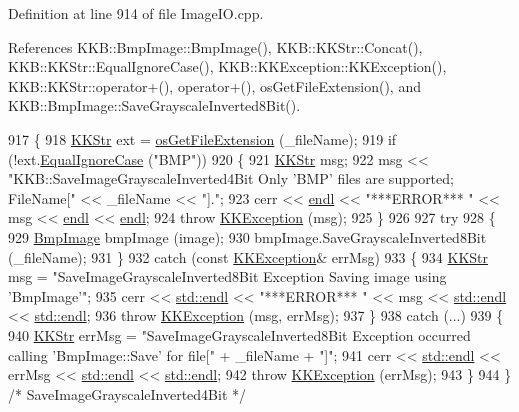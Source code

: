 Definition at line 914 of file Image\+I\+O.\+cpp.



References K\+K\+B\+::\+Bmp\+Image\+::\+Bmp\+Image(), K\+K\+B\+::\+K\+K\+Str\+::\+Concat(), K\+K\+B\+::\+K\+K\+Str\+::\+Equal\+Ignore\+Case(), K\+K\+B\+::\+K\+K\+Exception\+::\+K\+K\+Exception(), K\+K\+B\+::\+K\+K\+Str\+::operator+(), operator+(), os\+Get\+File\+Extension(), and K\+K\+B\+::\+Bmp\+Image\+::\+Save\+Grayscale\+Inverted8\+Bit().


\begin{DoxyCode}
917 \{
918   \hyperlink{class_k_k_b_1_1_k_k_str}{KKStr}  ext = \hyperlink{namespace_k_k_b_ac66b0fee156008ea19ba4a0068378743}{osGetFileExtension} (\_fileName);
919   \textcolor{keywordflow}{if}  (!ext.\hyperlink{class_k_k_b_1_1_k_k_str_a562f9696417c53f66bc4088eac072ab5}{EqualIgnoreCase} (\textcolor{stringliteral}{"BMP"}))
920   \{
921     \hyperlink{class_k_k_b_1_1_k_k_str}{KKStr} msg;
922     msg << \textcolor{stringliteral}{"KKB::SaveImageGrayscaleInverted4Bit   Only 'BMP' files are supported;  FileName["} << \_fileName 
      << \textcolor{stringliteral}{"]."};
923     cerr << \hyperlink{namespace_k_k_b_ad1f50f65af6adc8fa9e6f62d007818a8}{endl} << \textcolor{stringliteral}{"***ERROR***    "} << msg << \hyperlink{namespace_k_k_b_ad1f50f65af6adc8fa9e6f62d007818a8}{endl} << \hyperlink{namespace_k_k_b_ad1f50f65af6adc8fa9e6f62d007818a8}{endl};
924     \textcolor{keywordflow}{throw} \hyperlink{class_k_k_b_1_1_k_k_exception}{KKException} (msg);
925   \}
926 
927   \textcolor{keywordflow}{try}
928   \{
929     \hyperlink{class_k_k_b_1_1_bmp_image}{BmpImage}  bmpImage (image);
930     bmpImage.SaveGrayscaleInverted8Bit (\_fileName);
931   \}
932   \textcolor{keywordflow}{catch}  (\textcolor{keyword}{const} \hyperlink{class_k_k_b_1_1_k_k_exception}{KKException}&  errMsg)
933   \{
934     \hyperlink{class_k_k_b_1_1_k_k_str}{KKStr} msg = \textcolor{stringliteral}{"SaveImageGrayscaleInverted8Bit  Exception  Saving image using 'BmpImage'"};
935     cerr << \hyperlink{namespace_k_k_b_ad1f50f65af6adc8fa9e6f62d007818a8}{std::endl} << \textcolor{stringliteral}{"***ERROR***    "} << msg << \hyperlink{namespace_k_k_b_ad1f50f65af6adc8fa9e6f62d007818a8}{std::endl} << 
      \hyperlink{namespace_k_k_b_ad1f50f65af6adc8fa9e6f62d007818a8}{std::endl};
936     \textcolor{keywordflow}{throw} \hyperlink{class_k_k_b_1_1_k_k_exception}{KKException} (msg, errMsg);
937   \}
938   \textcolor{keywordflow}{catch} (...)
939   \{
940     \hyperlink{class_k_k_b_1_1_k_k_str}{KKStr}  errMsg = \textcolor{stringliteral}{"SaveImageGrayscaleInverted8Bit   Exception occurred calling 'BmpImage::Save'  for
       file["} + \_fileName + \textcolor{stringliteral}{"]"};
941     cerr << \hyperlink{namespace_k_k_b_ad1f50f65af6adc8fa9e6f62d007818a8}{std::endl} << errMsg << \hyperlink{namespace_k_k_b_ad1f50f65af6adc8fa9e6f62d007818a8}{std::endl} << \hyperlink{namespace_k_k_b_ad1f50f65af6adc8fa9e6f62d007818a8}{std::endl};
942     \textcolor{keywordflow}{throw}  \hyperlink{class_k_k_b_1_1_k_k_exception}{KKException} (errMsg);
943   \}
944 \}  \textcolor{comment}{/* SaveImageGrayscaleInverted4Bit */}
\end{DoxyCode}
